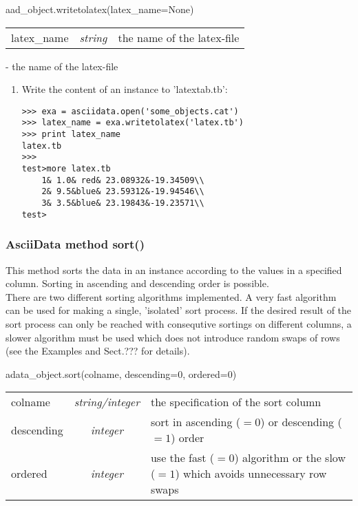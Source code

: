aad\_object.writetolatex(latex\_name=None)


\begin{tabular}{lcl}
latex\_name & {\it string} & the name of the latex-file\\
\end{tabular}

- the name of the latex-file

\begin{enumerate}
\item Write the content of an \ad instance to 'latextab.tb':
\begin{small}
\begin{verbatim}
>>> exa = asciidata.open('some_objects.cat')
>>> latex_name = exa.writetolatex('latex.tb')
>>> print latex_name
latex.tb
>>>
test>more latex.tb
    1& 1.0& red& 23.08932&-19.34509\\
    2& 9.5&blue& 23.59312&-19.94546\\
    3& 3.5&blue& 23.19843&-19.23571\\
test>
\end{verbatim}
\end{small}
\end{enumerate}


\subsubsection{AsciiData method sort()}
\label{adm_sort}
%
This method sorts the data in an \ad instance according to the values
in a specified column. Sorting in ascending and descending order is
possible.\\
There are two different sorting algorithms implemented. A very fast algorithm
can be used for making a single, 'isolated' sort process. If the desired result
of the sort process can only be reached with consequtive sortings on different
columns, a slower algorithm must be used which does not introduce random
swaps of rows (see the Examples and Sect.??? for details).


adata\_object.sort(colname, descending=0, ordered=0)

\begin{tabular}{lcl}
colname & {\it string/integer} & the specification of the sort column\\
descending & {\it integer} & sort in ascending ($=0$) or descending ($=1$) order\\
ordered & {\it integer} & use the fast ($=0$) algorithm or the slow
($=1$) which avoids unnecessary row swaps\\
\end{tabular}

